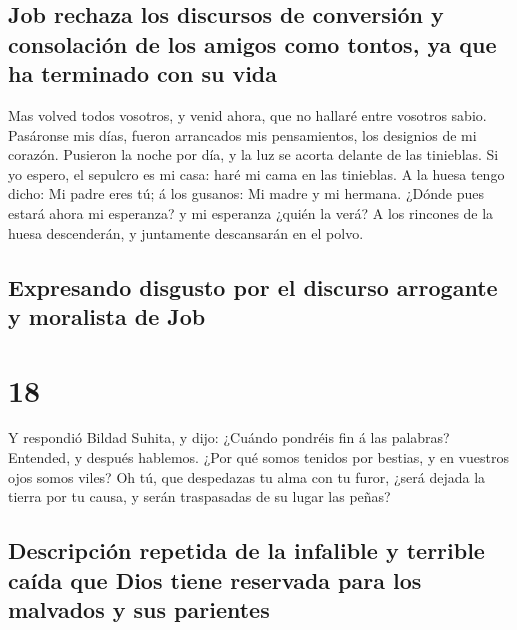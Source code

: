 \hypertarget{job-rechaza-los-discursos-de-conversiuxf3n-y-consolaciuxf3n-de-los-amigos-como-tontos-ya-que-ha-terminado-con-su-vida}{%
\subsection{Job rechaza los discursos de conversión y consolación de los
amigos como tontos, ya que ha terminado con su
vida}\label{job-rechaza-los-discursos-de-conversiuxf3n-y-consolaciuxf3n-de-los-amigos-como-tontos-ya-que-ha-terminado-con-su-vida}}

 Mas volved todos vosotros, y venid ahora, que no hallaré
entre vosotros sabio.  Pasáronse mis días, fueron
arrancados mis pensamientos, los designios de mi corazón.
 Pusieron la noche por día, y la luz se acorta delante de
las tinieblas.  Si yo espero, el sepulcro es mi casa:
haré mi cama en las tinieblas.  A la huesa tengo dicho:
Mi padre eres tú; á los gusanos: Mi madre y mi hermana. 
¿Dónde pues estará ahora mi esperanza? y mi esperanza ¿quién la verá?
 A los rincones de la huesa descenderán, y juntamente
descansarán en el polvo.

\hypertarget{expresando-disgusto-por-el-discurso-arrogante-y-moralista-de-job}{%
\subsection{Expresando disgusto por el discurso arrogante y moralista de
Job}\label{expresando-disgusto-por-el-discurso-arrogante-y-moralista-de-job}}

\hypertarget{section-17}{%
\section{18}\label{section-17}}

 Y respondió Bildad Suhita, y dijo:  ¿Cuándo
pondréis fin á las palabras? Entended, y después hablemos.
 ¿Por qué somos tenidos por bestias, y en vuestros ojos
somos viles?  Oh tú, que despedazas tu alma con tu furor,
¿será dejada la tierra por tu causa, y serán traspasadas de su lugar las
peñas?

\hypertarget{descripciuxf3n-repetida-de-la-infalible-y-terrible-cauxedda-que-dios-tiene-reservada-para-los-malvados-y-sus-parientes}{%
\subsection{Descripción repetida de la infalible y terrible caída que
Dios tiene reservada para los malvados y sus
parientes}\label{descripciuxf3n-repetida-de-la-infalible-y-terrible-cauxedda-que-dios-tiene-reservada-para-los-malvados-y-sus-parientes}}

